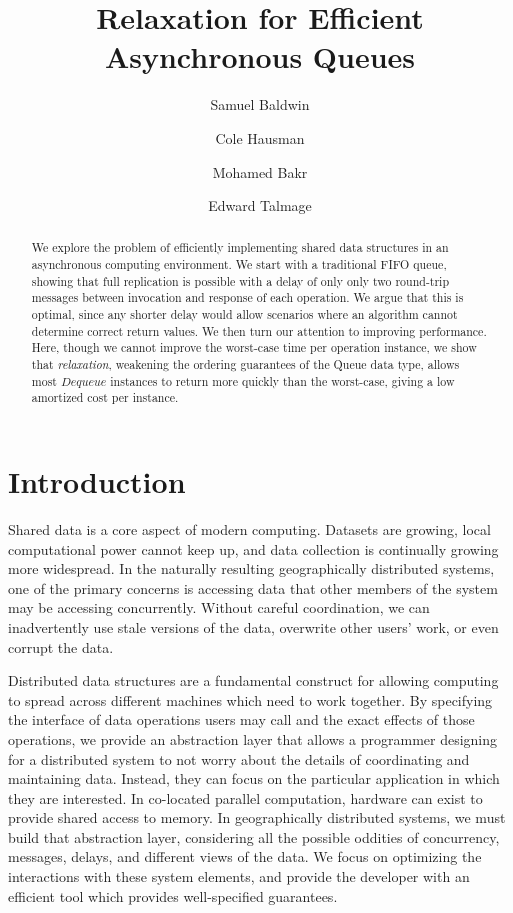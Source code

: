 \documentclass[a4paper,anonymous,USenglish]{lipics-v2021}
\title{Relaxation for Efficient Asynchronous Queues}
\author{Samuel Baldwin}{Bucknell University, USA}{}{https://orcid.org/0009-0009-0272-759X}{}
\author{Cole Hausman}{Bucknell University, USA}{}{}{}
\author{Mohamed Bakr}{Bucknell University, USA}{}{}{}
\author{Edward Talmage}{Bucknell Univserity, USA}{elt006@bucknell.edu}{https://orcid.org/0009-0001-9108-6190}{}
\theoremstyle{definition}
\begin{document}
\maketitle

\begin{abstract}
We explore the problem of efficiently implementing shared data structures in an asynchronous computing environment.  We start with a traditional FIFO queue, showing that full replication is possible with a delay of only only two round-trip messages between invocation and response of each operation.  We argue that this is optimal, since any shorter delay would allow scenarios where an algorithm cannot determine correct return values.  We then turn our attention to improving performance.  Here, though we cannot improve the worst-case time per operation instance, we show that \emph{relaxation}, weakening the ordering guarantees of the Queue data type, allows most $Dequeue$ instances to return more quickly than the worst-case, giving a low amortized cost per instance.
\end{abstract}

\section{Introduction}

Shared data is a core aspect of modern computing.  Datasets are growing, local computational power cannot keep up, and data collection is continually growing more widespread.  In the naturally resulting geographically distributed systems, one of the primary concerns is accessing data that other members of the system may be accessing concurrently.  Without careful coordination, we can inadvertently use stale versions of the data, overwrite other users' work, or even corrupt the data.

Distributed data structures are a fundamental construct for allowing computing to spread across different machines which need to work together.  By specifying the interface of data operations users may call and the exact effects of those operations, we provide an abstraction layer that allows a programmer designing for a distributed system to not worry about the details of coordinating and maintaining data.  Instead, they can focus on the particular application in which they are interested.  In co-located parallel computation, hardware can exist to provide shared access to memory.  In geographically distributed systems, we must build that abstraction layer, considering all the possible oddities of concurrency, messages, delays, and different views of the data.  We focus on optimizing the interactions with these system elements, and provide the developer with an efficient tool which provides well-specified guarantees.
\end{document}

